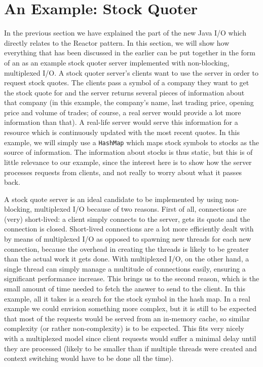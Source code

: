 \documentclass[a4paper,10pt]{article}
\begin{document}
\section{An Example: Stock Quoter}
\label{example}

In the previous section we have explained the part of the new Java I/O which directly relates to the Reactor pattern. In
this section, we will show how everything that has been discussed in the earlier can be put together in the form of an
as an example stock quoter server implemented with non-blocking, multiplexed I/O. A stock quoter server's clients want to use the
server in order to request stock quotes. The clients pass a symbol of a company they want to get the stock quote for and the server
returns several pieces of information about that company (in this example, the company's name, last trading price, opening price
and volume of trades; of course, a real server would provide a lot more information than that). A real-life server would serve this
information for a resource which is continuously updated with the most recent quotes. In this example, we will simply use a
\texttt{HashMap} which maps stock symbols to stocks as the source of information. The information about stocks is thus static,
but this is of little relevance to our example, since the interest here is to show how the server processes requests from clients, and
not really to worry about what it passes back.

A stock quote server is an ideal candidate to be implemented by using non-blocking, multiplexed I/O because of two reasons.
First of all, connections are (very) short-lived: a client simply connects to the server, gets its quote and the connection is closed.
Short-lived connections are a lot more efficiently dealt with by means of multiplexed I/O as opposed to spawning new threads
for each new connection, because the overhead in creating the threads is likely to be greater than the actual work it gets done.
With multiplexed I/O, on the other hand, a single thread can simply manage a multitude of connections easily, ensuring a
significant performance increase. This brings us to the second reason, which is the small amount of time needed to fetch the
answer to send to the client. In this example, all it takes is a search for the stock symbol in the hash map. In a real example
we could envision something more complex, but it is still to be expected that most of the requests would be served from an
in-memory cache, so similar complexity (or rather non-complexity) is to be expected. This fits very nicely with a multiplexed
model since client requests would suffer a minimal delay until they are processed (likely to be smaller than if multiple threads
were created and context switching would have to be done all the time).
\end{document}
